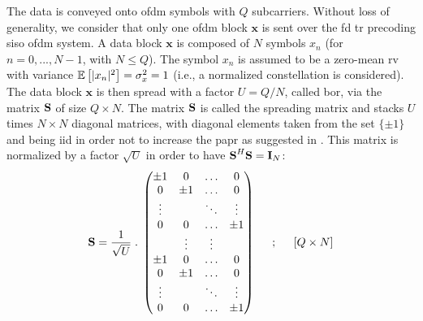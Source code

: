 The data is conveyed onto \gls{ofdm} symbols with $Q$ subcarriers. Without loss of generality, we consider that only one \gls{ofdm} block $\textbf{x}$ is sent over the \gls{fd} \gls{tr} precoding \gls{siso} \gls{ofdm} system. A data block $\textbf{x}$ is composed of $N$ symbols $x_n$ (for $n = 0,..., N-1$, with $N\leq Q$). The symbol $x_n$ is assumed to be a zero-mean \gls{rv} with variance $\mathbb{E} \left[|x_n|^2\right] = \sigma_x^2 = 1$ (i.e., a normalized constellation is considered). The data block $\textbf{x}$ is then spread with a factor $U = Q/N$, called \gls{bor}, via the matrix $\textbf{S}$ of size $Q\times N$. The matrix $\textbf{S}$ is called the spreading matrix and stacks $U$ times $N\times N$ diagonal matrices, with diagonal elements taken from the set $\{\pm1\}$ and being \gls{iid} in order not to increase the \gls{papr} as suggested in \cite{papr}. 
This matrix is normalized by a factor $\sqrt{U}$ in order to have $\textbf{S}^H \textbf{S} = \textbf{I}_N$:
\begin{equation}
\textbf{S}= \frac{1}{\sqrt{U}} \; . \;
   \begin{pmatrix}
    \pm 1 & 0 & \hdots & 0 \\
    0 & \pm 1 & \hdots & 0 \\
    \vdots & & \ddots & \vdots \\
    0 & 0 & \hdots & \pm 1 \\
     & \vdots& \vdots& \\
    \pm 1 & 0 & \hdots & 0 \\
    0 & \pm 1 & \hdots & 0 \\
    \vdots & & \ddots & \vdots \\
    0 & 0 & \hdots & \pm 1
 \end{pmatrix}
  \hspace{.2in} ; \hspace{.2in} [Q \times N]
 \label{eq:spread_mat}
\end{equation}
